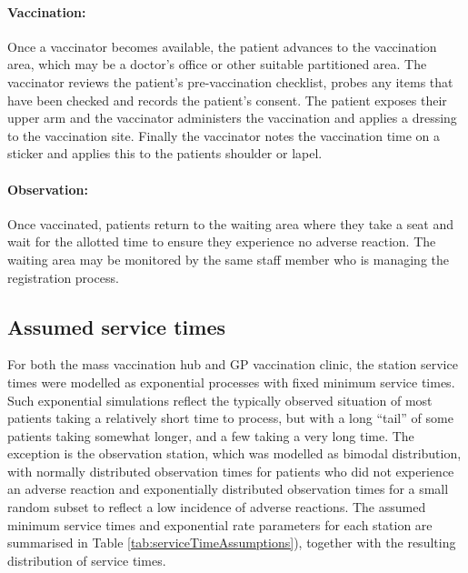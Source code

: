 \documentclass{article}
\begin{document}
\hypertarget{vaccination-1}{%
\paragraph{Vaccination:}\label{vaccination-1}}

Once a vaccinator becomes available, the patient advances to the
vaccination area, which may be a doctor's office or other suitable
partitioned area. The vaccinator reviews the patient's pre-vaccination
checklist, probes any items that have been checked and records the
patient's consent. The patient exposes their upper arm and the
vaccinator administers the vaccination and applies a dressing to the
vaccination site. Finally the vaccinator notes the vaccination time on a
sticker and applies this to the patients shoulder or lapel.

\hypertarget{observation-1}{%
\paragraph{Observation:}\label{observation-1}}

Once vaccinated, patients return to the waiting area where they take a
seat and wait for the allotted time to ensure they experience no adverse
reaction. The waiting area may be monitored by the same staff member who
is managing the registration process.

\hypertarget{assumed-service-times}{%
\subsection{Assumed service times}\label{assumed-service-times}}

For both the mass vaccination hub and GP vaccination clinic, the station
service times were modelled as exponential processes with fixed minimum
service times. Such exponential simulations reflect the typically
observed situation of most patients taking a relatively short time to
process, but with a long ``tail'' of some patients taking somewhat
longer, and a few taking a very long time. The exception is the
observation station, which was modelled as bimodal distribution, with
normally distributed observation times for patients who did not
experience an adverse reaction and exponentially distributed observation
times for a small random subset to reflect a low incidence of adverse
reactions. The assumed minimum service times and exponential rate
parameters for each station are summarised in Table
\ref{tab:serviceTimeAssumptions}), together with the resulting
distribution of service times.
\end{document}
